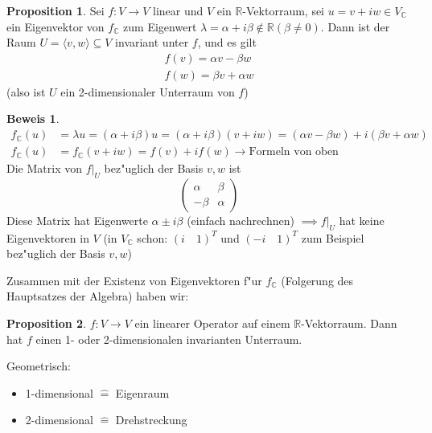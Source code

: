 \documentclass[oneside,fontsize=11pt,paper=a4,BCOR=0mm,DIV=12,automark,headsepline]{scrbook}
\theoremstyle{remark}
\theoremstyle{definition}
\newtheorem*{proposition}{Proposition}
\theoremstyle{definition}
\newtheorem*{prof}{Beweis}
\theoremstyle{remark}
\begin{document}
\begin{proposition}
  Sei \(f: V\to V\) linear und \(V\) ein \(\mathbb{R}\)-Vektorraum, sei \(u = v + i w \in V_{\mathbb{C}}\) ein Eigenvektor von \(f_{\mathbb{C}}\) zum Eigenwert \(\lambda = \alpha + i \beta \not\in \mathbb{R} (\beta \neq 0)\). Dann ist der Raum \(U = \langle v, w\rangle\subseteq V\) invariant unter \(f\), und es gilt
  \begin{align*}
    f(v) = \alpha v - \beta w\\
    f(w) = \beta v + \alpha w
  \end{align*}
  (also ist \(U\) ein 2-dimensionaler Unterraum von \(f\))
\end{proposition}

\begin{prof}
  \begin{align*}
    f_{\mathbb{C}}(u) &= \lambda u = (\alpha + i \beta) u = (\alpha + i\beta)(v + iw) = (\alpha v - \beta w) + i(\beta v + \alpha w)\\
    f_{\mathbb{C}}(u) &= f_{\mathbb{C}}(v+iw) = f(v) + if(w) \rightarrow \text{Formeln von oben}
  \end{align*}
  Die Matrix von \(f|_U\) bez"uglich der Basis \(v, w\) ist
  \[
    \begin{pmatrix}
      \alpha & \beta \\
      -\beta & \alpha
    \end{pmatrix}
  \]
  Diese Matrix hat Eigenwerte \(\alpha \pm i\beta\) (einfach nachrechnen) \(\implies f|_U\) hat keine Eigenvektoren in \(V\) (in \(V_{\mathbb{C}}\) schon: \((i\quad 1)^T\) und \((-i\quad 1)^T\) zum Beispiel bez"uglich der Basis \(v, w\))
\end{prof}

Zusammen mit der Existenz von Eigenvektoren f"ur $f_{\mathbb{C}}$ (Folgerung des Hauptsatzes der Algebra) haben wir:

\begin{proposition}
  \(f: V\to V\) ein linearer Operator auf einem $\mathbb{R}$-Vektorraum. Dann hat $f$ einen 1-
  oder 2-dimensionalen invarianten Unterraum.
\end{proposition}

\begin{relation}
  Geometrisch:
  \begin{itemize}
  \item 1-dimensional \(\hat{=}\) Eigenraum
  \item 2-dimensional \(\hat{=}\) Drehstreckung
  \end{itemize}
\end{relation}
\end{document}

